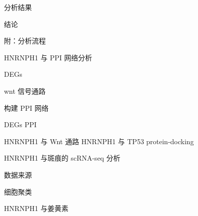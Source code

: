 \documentclass[
  ignorenonframetext,
]{beamer}
\begin{document}
\begin{frame}{分析结果}
\protect\hypertarget{results}{}
\end{frame}

\begin{frame}{结论}
\protect\hypertarget{dis}{}
\end{frame}

\begin{frame}{附：分析流程}
\protect\hypertarget{workflow}{}
\begin{block}{HNRNPH1 与 PPI 网络分析}
\protect\hypertarget{hnrnph1-ux4e0e-ppi-ux7f51ux7edcux5206ux6790}{}
\begin{block}{DEGs}
\protect\hypertarget{degs}{}
\end{block}

\begin{block}{wnt 信号通路}
\protect\hypertarget{wnt-ux4fe1ux53f7ux901aux8def}{}
\end{block}

\begin{block}{构建 PPI 网络}
\protect\hypertarget{ux6784ux5efa-ppi-ux7f51ux7edc}{}
\begin{block}{DEGs PPI}
\protect\hypertarget{degs-ppi}{}
\end{block}

\begin{block}{HNRNPH1 与 Wnt 通路}
\protect\hypertarget{hnrnph1-ux4e0e-wnt-ux901aux8def}{}
HNRNPH1 与 TP53 protein-docking
\end{block}
\end{block}
\end{block}

\begin{block}{HNRNPH1 与斑痕的 scRNA-seq 分析}
\protect\hypertarget{hnrnph1-ux4e0eux6591ux75d5ux7684-scrna-seq-ux5206ux6790}{}
\begin{block}{数据来源}
\protect\hypertarget{ux6570ux636eux6765ux6e90}{}
\end{block}

\begin{block}{细胞聚类}
\protect\hypertarget{ux7ec6ux80deux805aux7c7b}{}
\end{block}
\end{block}

\begin{block}{HNRNPH1 与姜黄素}
\protect\hypertarget{hnrnph1-ux4e0eux59dcux9ec4ux7d20}{}
\end{block}
\end{frame}
\end{document}

